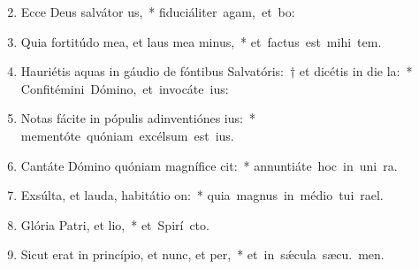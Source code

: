 \begin{flushleft}
\begin{enumerate}[leftmargin=*]
\setcounter{enumi}{1}

\item Ecce Deus salvátor us,~* \mbox{fiduciáliter agam, et  bo:}
\item Quia fortitúdo mea, et laus mea minus,~* \mbox{et factus est mihi  tem.}
\item Hauriétis aquas in gáudio de fóntibus Salvatóris:~†  et dicétis in die la:~* \mbox{Confitémini Dómino, et invocáte  ius:}
\item Notas fácite in pópulis adinventiónes ius:~* \mbox{mementóte quóniam excélsum est  ius.}
\item Cantáte Dómino quóniam magnífice cit:~* \mbox{annuntiáte hoc in uni ra.}
\item Exsúlta, et lauda, habitátio on:~* \mbox{quia magnus in médio tui  rael.}
\item Glória Patri, et lio,~* \mbox{et Spirí cto.}
\item Sicut erat in princípio, et nunc, et per,~* \mbox{et in s\'{\ae}cula sæcu. men.}

\end{enumerate}
\end{flushleft}

